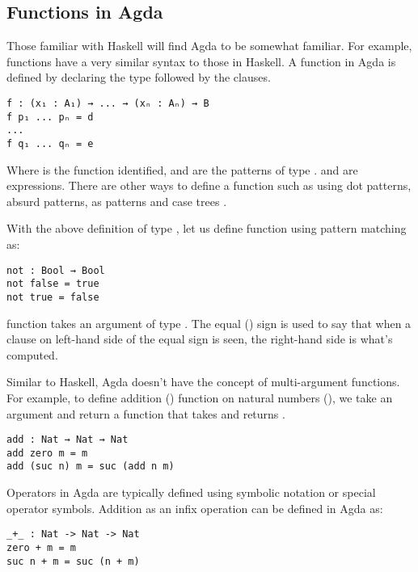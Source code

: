 \subsection{Functions in Agda}
Those familiar with Haskell will find Agda to be somewhat familiar. For example,
functions have a very similar syntax to those in Haskell. A function in Agda is
defined by declaring the type followed by the clauses.

\begin{verbatim}
f : (x₁ : A₁) → ... → (xₙ : Aₙ) → B
f p₁ ... pₙ = d
...
f q₁ ... qₙ = e
\end{verbatim} 

Where  is the function identified,  and  are the
patterns of type .  and  are expressions. There
are other ways to define a function such as using dot patterns, absurd patterns,
as patterns and case trees \cite{10.1007/978-3-642-03359-9_6}.

With the above definition of type , let us define  
function using pattern matching as:

\begin{verbatim}
not : Bool → Bool
not false = true
not true = false
\end{verbatim} 

 function takes an argument of type . The equal
(\inline{=}) sign is used to say that when a clause on left-hand side of the
equal sign is seen, the right-hand side is what's computed.  

Similar to Haskell, Agda doesn't have the concept of multi-argument functions.
For example, to define addition () function on natural numbers
(), we take an argument  and return a function that
takes  and returns .

\begin{verbatim}
add : Nat → Nat → Nat
add zero m = m
add (suc n) m = suc (add n m)
\end{verbatim}

Operators in Agda are typically defined using symbolic notation or special
operator symbols. Addition as an infix operation can be defined in Agda as:

\label{code:Add}
\begin{verbatim}
_+_ : Nat -> Nat -> Nat
zero + m = m
suc n + m = suc (n + m)
\end{verbatim}

